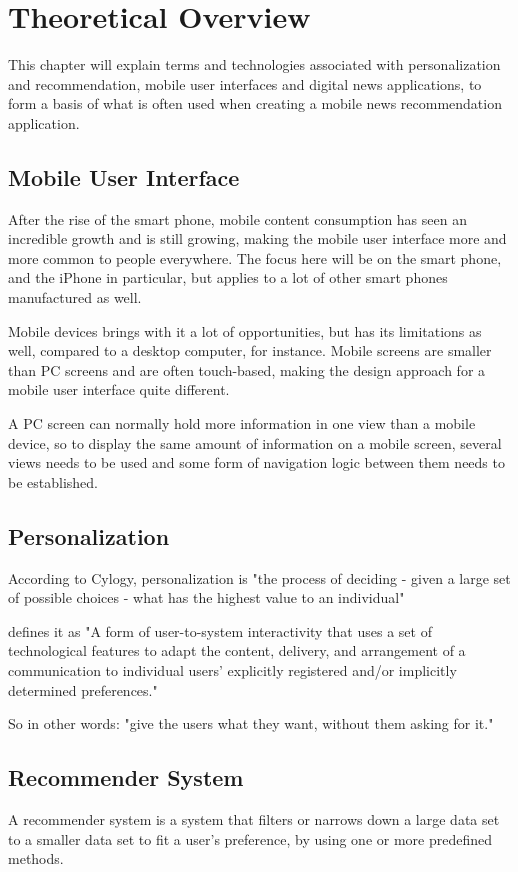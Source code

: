 \chapter{Theoretical Overview}
This chapter will explain terms and technologies associated with personalization and recommendation, mobile user interfaces and digital news applications, to form a basis of what is often used when creating a mobile news recommendation application.


\section{Mobile User Interface}
After the rise of the smart phone, mobile content consumption has seen an incredible growth and is still growing\cite{emarketer2012moretime}, making the mobile user interface more and more common to people everywhere. The focus here will be on the smart phone, and the iPhone in particular, but applies to a lot of other smart phones manufactured as well.

Mobile devices brings with it a lot of opportunities, but has its limitations as well, compared to a desktop computer, for instance. Mobile screens are smaller than PC screens and are often touch-based, making the design approach for a mobile user interface quite different.

A PC screen can normally hold more information in one view than a mobile device, so to display the same amount of information on a mobile screen, several views needs to be used and some form of navigation logic between them needs to be established.


\section{Personalization}

According to Cylogy, personalization is "the process of deciding - given a large set of possible choices - what has the highest value to an individual"\cite{personalization_overview}

\cite{thurman2012future} defines it as "A form of user-to-system interactivity that uses a set of technological features to adapt the content, delivery, and arrangement of a communication to individual users’ explicitly registered and/or implicitly determined preferences."

So in other words: "give the users what they want, without them asking for it."

\section{Recommender System}
\label{theoretical_overview_recommender_system}
A recommender system is a system that filters or narrows down a large data set to a smaller data set to fit a user's preference, by using one or more predefined methods.

